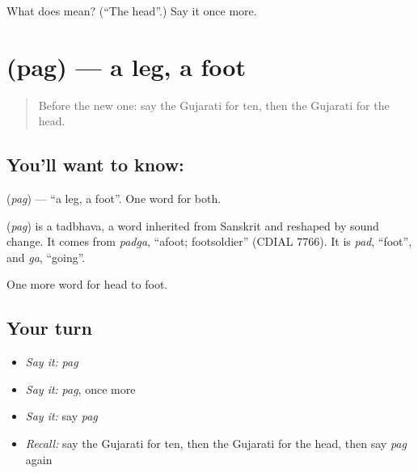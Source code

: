\begin{tcolorbox}[breakable,colback=teal!4,colframe=teal!35!black,title={Before you move on}]
What does  mean? (\textquotedblleft{}The head\textquotedblright{}.) Say it once more.
\end{tcolorbox}
\section[\texorpdfstring{\gu{પગ} (pag)}{પગ (pag)}]{ (pag) — a leg, a foot}

\label{lesson:GU-C46-leg}



\begin{quote}
Before the new one: say the Gujarati for ten, then the Gujarati for the head.
\end{quote}

\subsection*{You'll want to know: }
\textbf{} (\emph{pag}) — \textquotedblleft{}a leg, a foot\textquotedblright{}. One word for both.

\begin{cousinweb}
\textbf{} (\emph{pag}) is a tadbhava, a word inherited from Sanskrit and reshaped by sound change. It comes from \emph{padga}, \textquotedblleft{}afoot; footsoldier\textquotedblright{} (CDIAL 7766). It is \emph{pad}, \textquotedblleft{}foot\textquotedblright{}, and \emph{ga}, \textquotedblleft{}going\textquotedblright{}.
\end{cousinweb}

\begin{grammarlens}[title={What you've built}]
One more word for head to foot.
\end{grammarlens}

\subsection*{Your turn}
\begin{itemize}
\raggedright
  \item \emph{Say it:} \emph{pag}
  \item \emph{Say it:} \emph{pag}, once more
  \item \emph{Say it:} say \emph{pag}
  \item \emph{Recall:} say the Gujarati for ten, then the Gujarati for the head, then say \emph{pag} again
\end{itemize}

